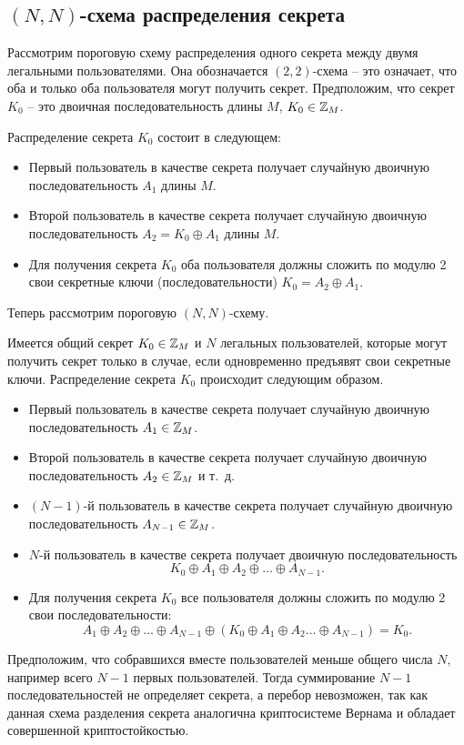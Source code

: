 \subsection[$(N, N)$-схема]{$(N, N)$-схема распределения секрета}

Рассмотрим пороговую схему распределения одного секрета между двумя легальными пользователями. Она обозначается $(2,2)$-схема -- это означает, что оба и только оба пользователя могут получить секрет. Предположим, что секрет $K_{0}$ -- это двоичная последовательность длины $M$, $K_{0} \in \mathbb{Z}_{M}$.

Распределение секрета $K_{0}$ состоит в следующем:
\begin{itemize}
    \item Первый пользователь в качестве секрета получает случайную двоичную последовательность $A_{1}$ длины $M$.
    \item Второй пользователь в качестве секрета получает случайную двоичную последовательность $A_{2} =K_{0} \oplus A_{1}$ длины $M$.
    \item Для получения секрета $K_{0}$ оба пользователя должны сложить по модулю 2 свои секретные ключи (последовательности)  $K_{0} = A_{2} \oplus A_{1}$.
\end{itemize}

Теперь рассмотрим пороговую $(N,N)$-схему.

Имеется общий секрет $K_{0} \in \mathbb{Z}_{M}$ и $N$ легальных пользователей, которые могут получить секрет только в случае, если одновременно предъявят свои секретные ключи. Распределение секрета $K_{0}$ происходит следующим образом.

\begin{itemize}
    \item Первый пользователь в качестве секрета получает случайную двоичную последовательность $A_{1} \in \mathbb{Z}_{M}$.
    \item Второй пользователь в качестве секрета получает случайную двоичную последовательность $A_{2}\in \mathbb{Z}_{M}$ и т.~д.
    \item $(N-1)$-й пользователь в качестве секрета получает случайную двоичную последовательность $A_{N-1}\in \mathbb{Z}_{M}$.
    \item $N$-й пользователь в качестве секрета получает двоичную последовательность
        \[ K_0 \oplus A_1 \oplus A_2 \oplus \dots \oplus A_{N-1}. \]
    \item Для получения секрета $K_0$ все пользователя должны сложить по модулю 2 свои последовательности:
        \[ A_1 \oplus A_2 \oplus \dots \oplus A_{N-1} \oplus (K_0 \oplus A_1 \oplus A_2 \dots \oplus A_{N-1}) = K_0. \]
\end{itemize}

Предположим, что собравшихся вместе пользователей меньше общего числа $N$, например всего $N-1$ первых пользователей. Тогда суммирование $N-1$ последовательностей не определяет секрета, а перебор невозможен, так как данная схема разделения секрета аналогична криптосистеме Вернама и обладает совершенной криптостойкостью.

